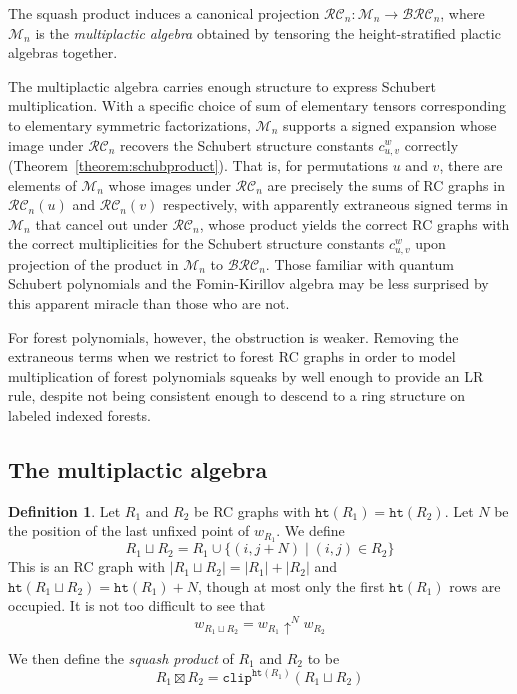 \documentclass{amsart}
\theoremstyle{definition}
\newtheorem{definition}[lemma]{Definition}
\theoremstyle{remark}
\numberwithin{equation}{subsection}
\newcommand{\shup}{{\uparrow}}
\newcommand{\wof}[1]{w_{#1}}
\newcommand{\hr}{\mathtt{ht}}
\newcommand{\clp}{\mathtt{clip}}
\newcommand{\BRC}{\mathcal{BRC}}
\newcommand{\RC}{\mathcal{RC}}
\begin{document}
The squash product induces a canonical projection $\RC_n:\mathcal{M}_n\to\BRC_n$, where $\mathcal{M}_n$ is the \emph{multiplactic algebra} obtained by tensoring the height-stratified plactic algebras together.

The multiplactic algebra carries enough structure to express Schubert multiplication. With a specific choice of sum of elementary tensors corresponding to elementary symmetric factorizations, $\mathcal{M}_n$ supports a signed expansion whose image under $\RC_n$ recovers the Schubert structure constants $c_{u,v}^w$ correctly (Theorem~\ref{theorem:schubproduct}). That is, for permutations $u$ and $v$, there are elements of $\mathcal{M}_n$ whose images under $\RC_n$ are precisely the sums of RC graphs in $\RC_n(u)$ and $\RC_n(v)$ respectively, with apparently extraneous signed terms in $\mathcal{M}_n$ that cancel out under $\RC_n$, whose product yields the correct RC graphs with the correct multiplicities for the Schubert structure constants $c_{u,v}^w$ upon projection of the product in $\mathcal{M}_n$ to $\BRC_n$. Those familiar with quantum Schubert polynomials and the Fomin-Kirillov algebra may be less surprised by this apparent miracle than those who are not.

For forest polynomials, however, the obstruction is weaker. Removing the extraneous terms when we restrict to forest RC graphs in order to model multiplication of forest polynomials squeaks by well enough to provide an LR rule, despite not being consistent enough to descend to a ring structure on labeled indexed forests.


\subsection{The multiplactic algebra}\label{section:multiplactic}
\begin{definition}
Let $R_1$ and $R_2$ be RC graphs with $\hr(R_1)=\hr(R_2)$. Let $N$ be the position of the last unfixed point of $\wof{R_1}$. We define
$$R_1\sqcup R_2 = R_1\cup \{(i,j+N)\mid (i,j)\in R_2\}$$
This is an RC graph with $|R_1\sqcup R_2| = |R_1| + |R_2|$ and $\hr(R_1\sqcup R_2)=\hr(R_1) + N$, though at most only the first $\hr(R_1)$ rows are occupied.  It is not too difficult to see that
$$\wof{R_1\sqcup R_2} = \wof{R_1}\shup^{N}\wof{R_2}$$

We then define the \emph{squash product} of $R_1$ and $R_2$ to be
$$R_1\boxtimes R_2 = \clp^{\hr(R_1)}(R_1\sqcup R_2)$$

\end{definition}
\end{document}
